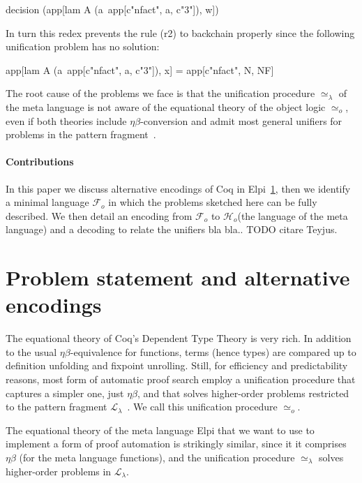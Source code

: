 \documentclass[sigconf,natbib=false]{acmart}
\newcommand{\UnifRel}{\ensuremath{\simeq}}
\newcommand{\Uo}{\ensuremath{\UnifRel_o}\xspace}
\newcommand{\Ue}{\ensuremath{\UnifRel_\lambda}\xspace}
\newcommand{\Fo}{\ensuremath{\mathcal{F}_{\!o}\xspace}} %
\newcommand{\Ho}{\ensuremath{\mathcal{H}_o}\xspace}
\begin{document}
\begin{elpicode}
decision (app[lam A (a\ app[c"nfact", a, c"3"]), w])
\end{elpicode}

\noindent
In turn this redex prevents the rule (r2) to backchain properly since
the following unification problem has no solution:

\begin{elpicode}
app[lam A (a\ app[c"nfact", a, c"3"]), x] =
  app[c"nfact", N, NF]
\end{elpicode}

\noindent
The root cause of the problems we face is that the unification procedure
\Ue of the meta language is not aware of the equational theory of the object
logic \Uo, even if both theories include $\eta\beta$-conversion and admit most general
unifiers for problems in the pattern fragment~\cite{miller92jsc}.

\paragraph{Contributions}
In this paper we discuss alternative encodings of Coq in
Elpi~\ref{sec:encodings}, then we identify a minimal language \Fo
in which the problems sketched here can be fully described.
We then detail an encoding  from \Fo{} to \Ho (the language of
the meta language) and a decoding  to relate the unifiers
bla bla.. TODO citare Teyjus.

\section{Problem statement and alternative encodings} %
\label{sec:encodings}

The equational theory of Coq's Dependent Type Theory is very rich. In
addition to the usual $\eta\beta$-equivalence for functions, terms (hence types)
are compared up to definition unfolding and fixpoint unrolling. Still,
for efficiency and predictability reasons, most form of automatic proof search
employ a unification procedure that captures a simpler one,
just $\eta\beta$, and that solves higher-order problems
restricted to the pattern fragment $\mathcal{L}_\lambda$~\cite{miller92jsc}.
We call this unification procedure \Uo{}.

The equational theory of the meta language Elpi that we want to use to
implement a form of proof automation is strikingly similar, since it
it comprises $\eta\beta$ (for the meta language functions), and the
unification procedure \Ue{} solves higher-order problems in
$\mathcal{L}_\lambda$.
\end{document}
